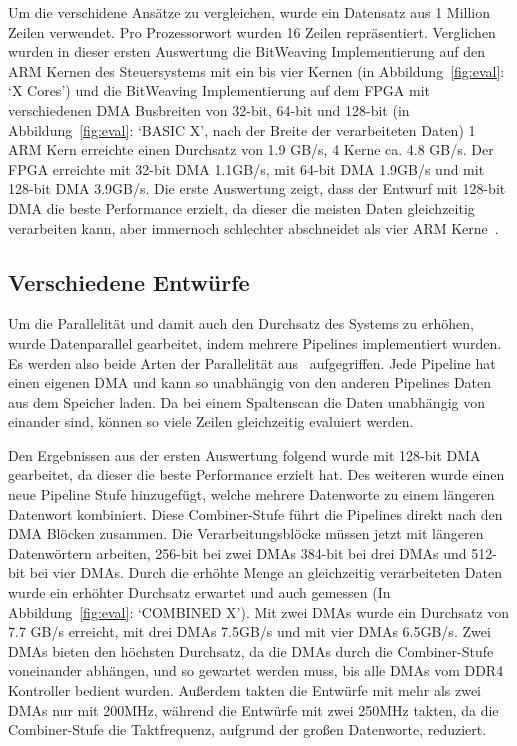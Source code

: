 \documentclass[conference]{IEEEtran}
\begin{document}
Um die verschidene Ansätze zu vergleichen, wurde ein Datensatz aus 1 Million Zeilen verwendet. Pro Prozessorwort wurden 16 Zeilen repräsentiert. Verglichen wurden in dieser ersten Auswertung
die BitWeaving Implementierung auf den ARM Kernen des Steuersystems mit ein bis vier Kernen (in Abbildung~\ref{fig:eval}: `X Cores') und die BitWeaving Implementierung
auf dem FPGA mit verschiedenen DMA Busbreiten von 32-bit, 64-bit und 128-bit (in Abbildung~\ref{fig:eval}: `BASIC X', nach der Breite der verarbeiteten Daten) 1 ARM Kern
erreichte einen Durchsatz von 1.9 GB/s, 4 Kerne ca. 4.8 GB/s. Der FPGA erreichte mit 32-bit DMA 1.1GB/s, mit 64-bit DMA 1.9GB/s und mit 128-bit DMA 3.9GB/s.
Die erste Auswertung zeigt, dass der Entwurf mit 128-bit DMA die beste Performance erzielt, da dieser die meisten Daten gleichzeitig verarbeiten kann,
aber immernoch schlechter abschneidet als vier ARM Kerne~\cite{lisa_column_2018}.


\subsection{Verschiedene Entwürfe}

Um die Parallelität und damit auch den Durchsatz des Systems zu erhöhen, wurde Datenparallel gearbeitet, indem mehrere Pipelines implementiert wurden. Es werden
also beide Arten der Parallelität aus~\cite{istvan_glass_2019} aufgegriffen. Jede Pipeline
hat einen eigenen DMA und kann so unabhängig von den anderen Pipelines Daten aus dem Speicher laden. Da bei einem Spaltenscan die Daten unabhängig von einander sind,
können so viele Zeilen gleichzeitig evaluiert werden.

Den Ergebnissen aus der ersten Auswertung folgend wurde mit 128-bit DMA gearbeitet, da dieser die beste Performance erzielt hat. Des weiteren wurde einen neue Pipeline Stufe
hinzugefügt, welche mehrere Datenworte zu einem längeren Datenwort kombiniert. Diese Combiner-Stufe führt die Pipelines direkt nach den DMA Blöcken zusammen. Die Verarbeitungsblöcke
müssen jetzt mit längeren Datenwörtern arbeiten, 256-bit bei zwei DMAs 384-bit bei drei DMAs und 512-bit bei vier DMAs. Durch die erhöhte Menge an gleichzeitig verarbeiteten Daten
wurde ein erhöhter Durchsatz erwartet und auch gemessen (In Abbildung~\ref{fig:eval}: `COMBINED X'). Mit zwei DMAs wurde ein Durchsatz von 7.7 GB/s erreicht, mit drei DMAs 7.5GB/s
und mit vier DMAs 6.5GB/s.
Zwei DMAs bieten den höchsten Durchsatz, da die DMAs durch die Combiner-Stufe voneinander abhängen, und so gewartet werden muss, bis alle DMAs vom DDR4 Kontroller bedient wurden.
Außerdem takten die Entwürfe mit mehr als zwei DMAs nur mit 200MHz, während die Entwürfe mit zwei 250MHz takten, da die Combiner-Stufe die Taktfrequenz, aufgrund der großen
Datenworte, reduziert.
\end{document}
